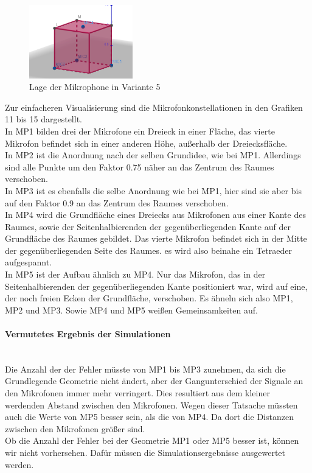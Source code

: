 \begin{figure}
\begin{minipage}[t]{0.33\linewidth}
\end{minipage}
\begin{minipage}[t]{0.33\linewidth}
\centering
\includegraphics[width=0.4\textwidth]{MP5}
\caption{Lage der Mikrophone in Variante 5}\label{fig:Lage der Mikrophone in Variante 5}
\end{minipage}
\end{figure}
Zur einfacheren Visualisierung sind die Mikrofonkonstellationen in den Grafiken 11 bis 15 dargestellt. \\
In MP1 bilden drei der Mikrofone ein Dreieck in einer Fläche, das vierte Mikrofon befindet sich in einer anderen Höhe, außerhalb der Dreiecksfläche.\\
In MP2 ist die Anordnung nach der selben Grundidee, wie bei MP1. Allerdings sind alle Punkte um den Faktor 0.75 näher an das Zentrum des Raumes verschoben.\\
In MP3 ist es ebenfalls die selbe Anordnung wie bei MP1, hier sind sie aber bis auf den Faktor 0.9 an das Zentrum des Raumes verschoben.\\
In MP4 wird die Grundfläche eines Dreiecks aus Mikrofonen aus einer Kante des Raumes, sowie der Seitenhalbierenden der gegenüberliegenden Kante auf der Grundfläche des Raumes gebildet. Das vierte Mikrofon befindet sich in der Mitte der gegenüberliegenden Seite des Raumes. es wird also beinahe ein Tetraeder aufgespannt. \\
In MP5 ist der Aufbau ähnlich zu MP4. Nur das Mikrofon, das in der Seitenhalbierenden der gegenüberliegenden Kante positioniert war, wird auf eine, der noch freien Ecken der Grundfläche, verschoben. Es ähneln sich also MP1, MP2 und MP3. Sowie MP4 und MP5 weißen Gemeinsamkeiten auf.

\paragraph{Vermutetes Ergebnis der Simulationen}\ \\
Die Anzahl der der Fehler müsste von MP1 bis MP3 zunehmen, da sich die Grundlegende Geometrie nicht ändert, aber der Gangunterschied der Signale an den Mikrofonen immer mehr verringert. Dies resultiert aus dem kleiner werdenden Abstand zwischen den Mikrofonen. Wegen dieser Tatsache müssten auch die Werte von MP5 besser sein, als die von MP4. Da dort die Distanzen zwischen den Mikrofonen größer sind.\\
Ob die Anzahl der  Fehler bei der Geometrie MP1 oder MP5 besser ist, können wir nicht vorhersehen. Dafür müssen die Simulationsergebnisse ausgewertet werden.
